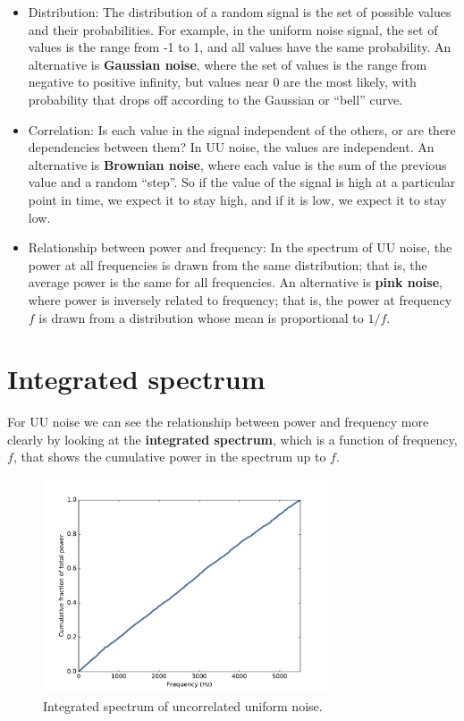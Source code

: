 \documentclass[12pt]{book}
\begin{document}
\begin{itemize}

\item Distribution: The distribution of a random signal is the set of
  possible values and their probabilities.  For example, in the
  uniform noise signal, the set of values is the range from -1 to 1,
  and all values have the same probability.  An alternative is
  {\bf Gaussian noise}, where the set of values is the range from negative
  to positive infinity, but values near 0 are the most likely, with
  probability that drops off according to the Gaussian or
  ``bell'' curve.

\item Correlation: Is each value in the signal independent of the
  others, or are there dependencies between them?  In UU noise, the
  values are independent.
  An alternative is {\bf Brownian noise}, where each value is the sum
  of the previous value and a random ``step''.  So if the value of the
  signal is high at a particular point in time, we expect it to stay
  high, and if it is low, we expect
  it to stay low.

\item Relationship between power and frequency: In the spectrum of UU
  noise, the power at all frequencies is drawn from the same
  distribution; that is, the average power is the same for all
  frequencies.  An alternative is {\bf pink noise}, where power is
  inversely related to frequency; that is, the power at frequency $f$
  is drawn from a distribution whose mean is proportional to $1/f$.

\end{itemize}


\section{Integrated spectrum}

For UU noise we can see the relationship between power and frequency
more clearly by looking at the {\bf integrated spectrum}, which
is a function of frequency, $f$, that shows the cumulative power in
the spectrum up to $f$.

\begin{figure}
\centerline{\includegraphics[height=2.5in]{figs/whitenoise2.pdf}}
\caption{Integrated spectrum of uncorrelated uniform noise.}
\label{fig.whitenoise2}
\end{figure}
\end{document}
